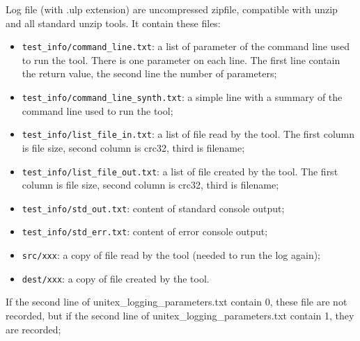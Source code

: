 Log file (with .ulp extension) are uncompressed zipfile, compatible with unzip and
all standard unzip tools. It contain these files:
\begin{itemize}
  \item \verb+test_info/command_line.txt+: a list of parameter of the
command line used to run the tool. There is one parameter on each line. The first line
contain the return value, the second line the number of parameters;

  \item \verb+test_info/command_line_synth.txt+: a simple line with a summary of the
command line used to run the tool;

  \item \verb+test_info/list_file_in.txt+: a list of file read by the tool.
  The first column is file size, second column is crc32, third is filename;

  \item \verb+test_info/list_file_out.txt+: a list of file created by the tool.
  The first column is file size, second column is crc32, third is filename;

  \item \verb+test_info/std_out.txt+: content of standard console output;

  \item \verb+test_info/std_err.txt+: content of error console output;

  \item \verb+src/xxx+: a copy of file read by the tool (needed to run the log again);

  \item \verb+dest/xxx+: a copy of file created by the tool.
\end{itemize}

If the second line of unitex\_logging\_parameters.txt contain 0, these file are not recorded, but
if the second line of unitex\_logging\_parameters.txt contain 1, they are recorded;

